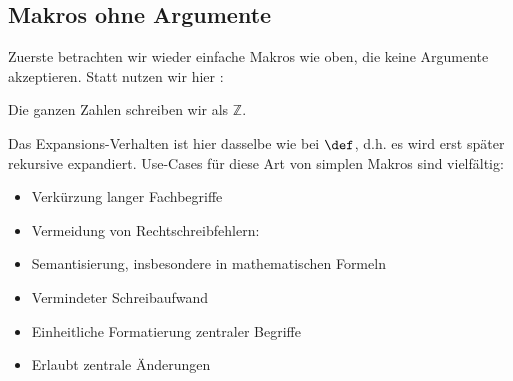 \subsection{Makros ohne Argumente}
Zuerste betrachten wir wieder einfache Makros wie oben, die keine Argumente akzeptieren.
Statt  nutzen wir hier :
\begin{latexlisting}
	\newcommand{\integers}{\mathds{Z}}

	Die ganzen Zahlen schreiben wir als $\integers$.
\end{latexlisting}
Das Expansions-Verhalten ist hier dasselbe wie bei $\texttt{\textbackslash def}$, d.h. es wird erst später rekursive expandiert.
Use-Cases für diese Art von simplen Makros sind vielfältig:
\begin{itemize}
	\item Verkürzung langer Fachbegriffe
	\item Vermeidung von Rechtschreibfehlern:
	\begin{latexlisting}
		\newcommand{\DNA}{Desoxyribonukleinsäure}
	\end{latexlisting}
	\item Semantisierung, insbesondere in mathematischen Formeln
	\begin{latexlisting}
		\newcommand{\iff}{\Leftrightarrow}
	\end{latexlisting}
	\item Vermindeter Schreibaufwand
	\item Einheitliche Formatierung zentraler Begriffe
	\begin{latexlisting}
		\newcommand{\germany}{\texttt{[image: germany-flag.png]} \textbf{Germany}}
	\end{latexlisting}
	\item Erlaubt zentrale Änderungen
	\begin{latexlisting}
		\newcommand{\toolname}{NetVisard}
	\end{latexlisting}
\end{itemize}

